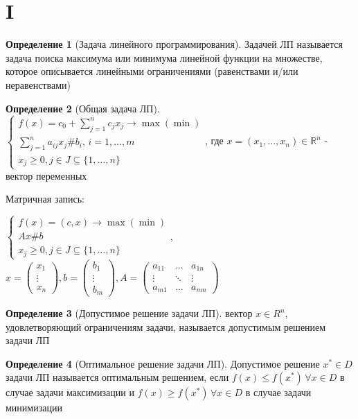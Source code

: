 \documentclass[a4paper]{article}
\theoremstyle{definition}
\newtheorem*{definition}{Определение}
\theoremstyle{remark}
\begin{document}
\section{I}
\begin{definition}[Задача линейного программирования]
	Задачей ЛП называется задача поиска максимума или минимума линейной функции
	на множестве, которое описывается линейными ограничениями (равенствами и/или неравенствами)

\end{definition}
\begin{definition}[Общая задача ЛП]
	$    \begin{cases}
			f(x) = c_0 + \sum_{j = 1}^n c_j x_j \to \max (\min)   \\
			\sum_{j = 1}^{n} a_{ij}x_j \# b_i, \, i = 1, \dots, m \\
			x_j \geq 0, j \in J\subseteq \{1, \dots, n\}
		\end{cases}$, где \(x = (x_1, ..., x_n)\in \mathbb{R}^n\) -  вектор переменных

	Матричная запись:

	$\begin{cases}
			f(x) = (c, x) \to \max(\min) \\
			Ax \# b                      \\
			x_j \geq 0, j \in J\subseteq \{1, \dots, n\}
		\end{cases}$, $x = \begin{pmatrix}
			x_1 \\ \vdots \\ x_n
		\end{pmatrix}, b = \begin{pmatrix}
			b_1 \\ \vdots \\ b_m
		\end{pmatrix},
		A = \begin{pmatrix}
			a_{11} & \dots  & a_{1n} \\
			\vdots & \ddots & \vdots \\
			a_{m1} & \dots  & a_{mn}
		\end{pmatrix}$
\end{definition}
\begin{definition}[Допустимое решение задачи ЛП]
	вектор $x\in R^n$, удовлетворяющий ограничениям задачи, называется допустимым решением задачи ЛП
\end{definition}
\begin{definition}[Оптимальное решение задачи ЛП]
	Допустимое решение $x^*\in D$ задачи ЛП называется оптимальным решением, если $f(x) \leq f(x^*) \, \forall x\in D$ в случае задачи максимизации и $f(x) \geq f(x^*) \, \forall x\in D$ в случае задачи минимизации
\end{definition}
\end{document}
